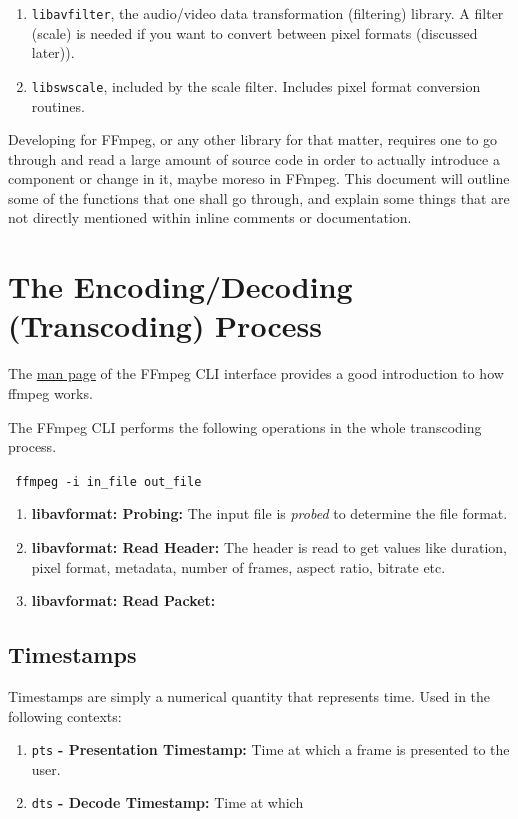 \documentclass{article}
\begin{document}
\begin{enumerate}
\item \texttt{libavfilter}, the audio/video data transformation (filtering) library. A filter (scale) is needed if you want to convert between pixel formats (discussed later)).
\item \texttt{libswscale}, included by the scale filter. Includes pixel format conversion routines.
\end{enumerate}

Developing for FFmpeg, or any other library for that matter, requires one to go through and read a large amount of source code in order to actually introduce a component or change in it, maybe moreso in FFmpeg. This document will outline some of the functions that one shall go through, and explain some things that are not directly mentioned within inline comments or documentation.

\section{The Encoding/Decoding (Transcoding) Process}

The \href{https://ffmpeg.org/ffmpeg.html\#toc-Detailed-description}{man page} of the FFmpeg CLI interface provides a good introduction to how ffmpeg works.

The FFmpeg CLI performs the following operations in the whole transcoding process.

\texttt{
ffmpeg -i in\_file out\_file
}

\begin{enumerate}
\item \textbf{libavformat: Probing:} The input file is \emph{probed} to determine the file format.
\item \textbf{libavformat: Read Header:} The header is read to get values like duration, pixel format, metadata, number of frames, aspect ratio, bitrate etc.
\item \textbf{libavformat: Read Packet:} 
\end{enumerate}

\subsection{Timestamps}

Timestamps are simply a numerical quantity that represents time. Used in the following contexts:

\begin{enumerate}
\item \texttt{pts} \textbf{- Presentation Timestamp:} Time at which a frame is presented to the user.
\item \texttt{dts} \textbf{- Decode Timestamp:} Time at which 
\end{enumerate}
\end{document}
